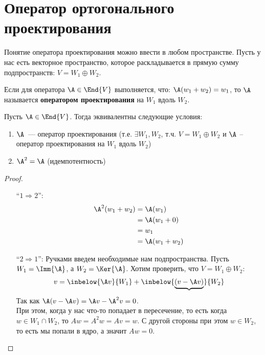 \section{Оператор ортогонального проектирования}
Понятие оператора проектирования можно ввести в любом пространстве. Пусть у нас есть 
векторное пространство, которое раскладывается в прямую сумму подпространств: $V = W_1 \oplus W_2$. 

\begin{conj}
    Если для оператора $\A \in \End{V}$ выполняется, что:  
    $\A(w_1 + w_2) = w_1$, то $\A$ называется \textbf{оператором проектирования} на $W_1$ вдоль $W_2$. 
\end{conj}

\begin{theorem}
    Пусть $\A \in \End{V}$. 
    Тогда эквивалентны следующие условия:
    \begin{enumerate}
        \item $\A$~--- оператор проектирования (т.е. $\exists W_1, W_2$, т.ч. $V = W_1 \oplus W_2$ и 
            $\A$ -- оператор проектирования на $W_1$ вдоль $W_2$)
        \item $\A^2 = \A$ (идемпотентность)
    \end{enumerate}
    \begin{proof} \quad

        \begin{itemize}
            \item[``$1 \Rightarrow 2$'':]
            \begin{align*}
                \A^2 (w_1 + w_2) &= \A(w_1) \\
                &= \A(w_1 + 0) \\
                &= w_1 \\
                &= \A(w_1 + w_2)
            \end{align*}
            \item[``$2 \Rightarrow 1$'':] Ручками введем необходимые нам подпространства. 
                Пусть $W_1 = \Imm{\A}$, а $W_2 = \Ker{\A}$. 
                Хотим проверить, что $V = W_1 \oplus W_2$:
                \begin{gather*}
                    v = \inbelow{\A v }{W_1} + \inbelow{\underbrace{(v - \A v)}}{W_2}
                \end{gather*}
                Так как $\A(v - \A v) = \A v - \A^2 v = 0$. \\
                При этом, когда у нас что-то попадает в пересечение, то есть когда $w \in W_1 \cap W_2$, 
                то $Aw = A^2 w = Av = w$. С другой стороны при этом $w \in W_2$, то есть мы попали в ядро, а значит $Aw = 0$.
                

\end{itemize}
\end{proof}
\end{theorem}
